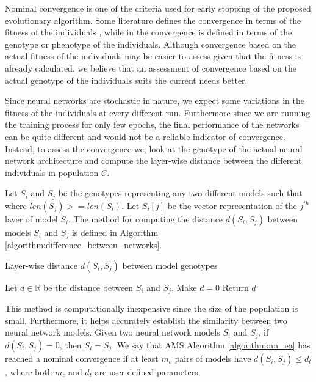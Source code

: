 \documentclass[12pt]{elsart}%
\begin{document}
Nominal convergence is one of the criteria used for early stopping of the proposed evolutionary algorithm. Some literature defines the convergence in terms of the fitness of the individuals \cite{Engelbrecht2007}, while in \cite{Krishnakumar1989} the convergence is defined in terms of the genotype or phenotype of the individuals. Although convergence based on the actual fitness of the individuals may be easier to assess given that the fitness is already calculated, we believe that an assessment of convergence based on the actual genotype of the individuals suits the current needs better.

Since neural networks are stochastic in nature, we expect some variations in the fitness of the individuals at every different run. Furthermore since we are running the training process for only few epochs, the final performance of the networks can be quite different and would not be a reliable indicator of convergence. Instead, to assess the convergence we, look at the genotype of the actual neural network architecture and compute the layer-wise distance between the different individuals in population $\mathcal{C}$.

Let $S_i$ and $S_j$ be the genotypes representing any two different models such that  where $len(S_j) >= len(S_i)$. Let $S_i[j]$ be the vector representation of the $j^{th}$ layer of model $S_i$. The method for computing the distance $d(S_i, S_j)$ between models $S_i$ and $S_j$ is defined in Algorithm \ref{algorithm:difference_between_networks}.

\begin{algorithm}[!htb]
\caption{Layer-wise distance $d(S_i, S_j)$ between model genotypes}
\begin{algorithmic}[0]
\State Let $d \in \mathbb{R}$ be the distance between $S_i$ and $S_j$. Make $d = 0$
\EndFor
{} 
\EndFor
\State Return $d$
\end{algorithmic}
\label{algorithm:difference_between_networks}
\end{algorithm}

This method is computationally inexpensive since the size of the population is small. Furthermore, it helps accurately establish the similarity between two neural network models. Given two neural network models $S_i$ and $S_j$, if $d(S_i, S_j) = 0$, then $S_i = S_j$. We say that AMS Algorithm \ref{algorithm:nn_ea} has reached a nominal convergence if at least $m_c$ pairs of models have $d(S_i, S_j) \leq d_t$, where both $m_c$ and $d_t$ are user defined parameters.
\end{document}

